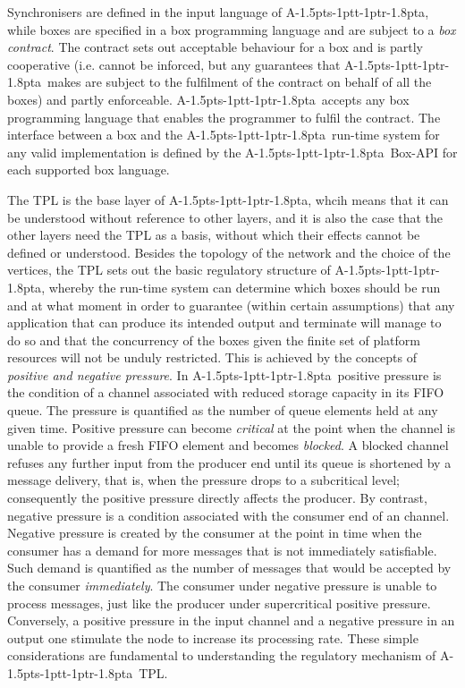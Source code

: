 \documentclass[11pt]{report}
\def\ak{{\textsf{A\kern-1.5pts\kern-1ptt\kern-1ptr\kern-1.8pta}}\kern-2pt{\it K\kern-2ptahn}}
\begin{document}
Synchronisers are defined in the
input language of \ak, while boxes are specified in a box programming language and are subject to a {\em box contract}. The contract sets out acceptable
behaviour for a box and is partly cooperative (i.e. cannot be inforced, but any guarantees that \ak\ makes are subject to the fulfilment of the contract on
behalf of all the boxes) and partly enforceable.  \ak\ accepts any box programming language that enables the programmer to fulfil the contract.
The interface between a box and the \ak\ run-time system for any valid implementation is defined by the \ak\ Box-API for each supported box language.

The TPL is the base layer of \ak, whcih means that it can be understood without reference to other layers, and it is also the case that the other layers
need the TPL as a basis, without which their effects cannot be defined or understood. Besides the topology of the network and the choice of the vertices,
the TPL sets out the basic regulatory structure of \ak, whereby the run-time system can determine which boxes should be run and at what moment
in order to guarantee (within certain assumptions) that any application that can produce its intended output and terminate will manage to do so
and that the concurrency of the boxes given the finite set of platform resources will not be unduly restricted. This is achieved by the concepts
of {\em positive and negative pressure}. In \ak\
positive pressure is the condition of a channel associated with reduced storage capacity in its FIFO queue. The pressure is quantified as the
number of queue elements held at any given time. Positive pressure can become {\em critical} at the point when the channel is unable to provide
a fresh FIFO element and becomes {\em blocked}. A blocked channel refuses
any further input from the producer end until its queue is shortened by a message delivery, that is, when the pressure
drops to a subcritical level; consequently the positive pressure directly affects the producer. By contrast,
negative pressure is a condition associated with the consumer end of an {\empty} channel. Negative pressure is created by the consumer at the point in
time when the consumer has a demand for more messages that is not immediately satisfiable. Such demand is quantified as the number of messages that would be accepted by the consumer {\em immediately}. The consumer under negative pressure is unable to process messages, just like the producer under supercritical positive pressure. Conversely, a positive pressure in the input channel and a negative pressure in an output one stimulate the node
to increase its processing rate. These simple considerations are fundamental to understanding the regulatory mechanism of \ak\ TPL.
\end{document}
